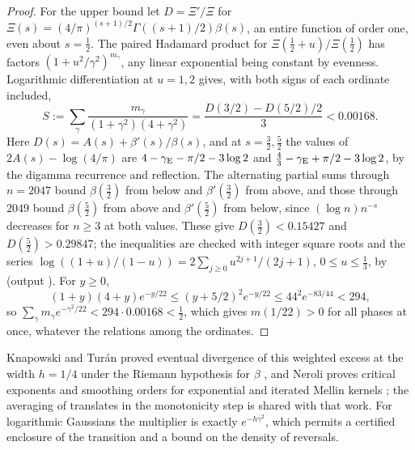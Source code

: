 \begin{proof}
For the upper bound let $D=\Xi'/\Xi$ for $\Xi(s)=(4/\pi)^{(s+1)/2}\Gamma((s+1)/2)\beta(s)$, an
entire function of order one, even about $s=\tfrac12$. The paired Hadamard product for
$\Xi(\tfrac12+u)/\Xi(\tfrac12)$ has factors $(1+u^2/\gamma^2)^{m_\gamma}$, any linear exponential
being constant by evenness. Logarithmic differentiation at $u=1,2$ gives, with both signs of
each ordinate included,
\[
 S:=\sum_\gamma\frac{m_\gamma}{(1+\gamma^2)(4+\gamma^2)}=\frac{D(3/2)-D(5/2)/2}{3}<0.00168 .
\]
Here $D(s)=A(s)+\beta'(s)/\beta(s)$, and at $s=\tfrac32,\tfrac52$ the values of $2A(s)-\log(4/\pi)$
are $4-\gamma_{\mathrm{E}}-\pi/2-3\log2$ and $\tfrac43-\gamma_{\mathrm{E}}+\pi/2-3\log2$, by the digamma recurrence and
reflection. The alternating partial sums through $n=2047$ bound $\beta(\tfrac32)$ from below and
$\beta'(\tfrac32)$ from above, and those through $2049$ bound $\beta(\tfrac52)$ from above and
$\beta'(\tfrac52)$ from below, since $(\log n)n^{-s}$ decreases for $n\ge3$ at both values. These
give $D(\tfrac32)<0.15427$ and $D(\tfrac52)>0.29847$; the inequalities are checked with integer
square roots and the series $\log((1+u)/(1-u))=2\sum_{j\ge0}u^{2j+1}/(2j+1)$, $0\le u\le\tfrac13$,
by  (output
). For $y\ge0$,
\[
 (1+y)(4+y)e^{-y/22}\le(y+5/2)^2e^{-y/22}\le44^2e^{-83/44}<294,
\]
so $\sum_\gamma m_\gamma e^{-\gamma^2/22}<294\cdot0.00168<\tfrac12$, which gives $m(1/22)>0$ for all
phases at once, whatever the relations among the ordinates.
\end{proof}

Knapowski and Tur\'an proved eventual divergence of this weighted excess at the width $h=1/4$
under the Riemann hypothesis for $\beta$ \cite{KnapowskiTuran1969Fragen,BentzPintz1980Quadratic,Suzuki2025Variants},
and Neroli proves critical exponents and smoothing orders for exponential and iterated Mellin
kernels \cite[Theorems~2.2 and~3.3]{Neroli2026Fujii}; the averaging of translates in the
monotonicity step is shared with that work. For logarithmic Gaussians the multiplier is exactly
$e^{-h\gamma^2}$, which permits a certified enclosure of the transition and a bound on the density
of reversals.

